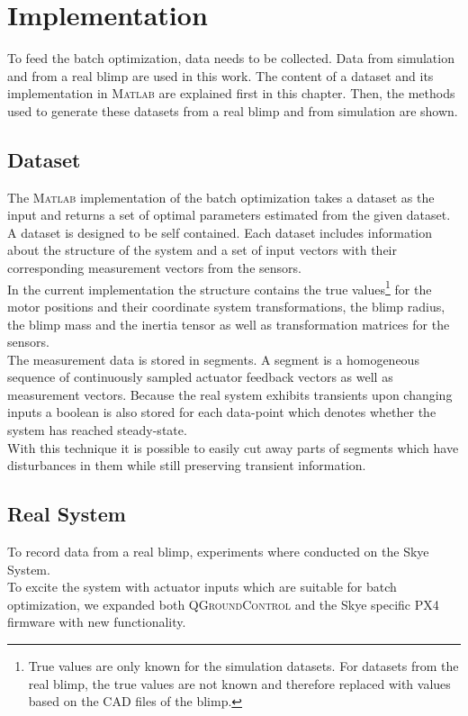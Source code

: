\chapter{Implementation}
\label{chap:implementation}

To feed the batch optimization, data needs to be collected.
Data from simulation and from a real blimp are used in this work.
The content of a dataset and its implementation in \textsc{Matlab} are explained first in this chapter.
Then, the methods used to generate these datasets from a real blimp and from simulation are shown.

\section{Dataset}
\label{sec:dataset}
The \textsc{Matlab} implementation of the batch optimization takes a dataset as the input and returns a set of optimal parameters estimated from the given dataset. \\
A dataset is designed to be self contained. 
Each dataset includes information about the structure of the system and a set of input vectors with their corresponding measurement vectors from the sensors. \\
In the current implementation the structure contains the true values\footnote{
True values are only known for the simulation datasets. 
For datasets from the real blimp, the true values are not known and therefore replaced with values based on the CAD files of the blimp.}
for the motor positions and their coordinate system transformations, the blimp radius, the blimp mass and the inertia tensor as well as transformation matrices for the sensors. \\
The measurement data is stored in segments.
A segment is a homogeneous sequence of continuously sampled actuator feedback vectors as well as measurement vectors.
Because the real system exhibits transients upon changing inputs a boolean is also stored for each data-point which denotes whether the system has reached steady-state. \\
With this technique it is possible to easily cut away parts of segments which have disturbances in them while still preserving transient information.

\section{Real System}
\label{sec:real_system}
To record data from a real blimp, experiments where conducted on the Skye System. \\
To excite the system with actuator inputs which are suitable for batch optimization, we expanded both \textsc{QGroundControl} and the Skye specific PX4 firmware with new functionality.

